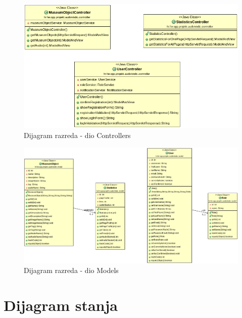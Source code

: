 			\begin{figure}[H]
				\includegraphics[scale=0.6]{slike/Controller.png}
				\centering
				\caption{ Dijagram razreda - dio Controllers}
				\label{fig:promjene}
			\end{figure}
		
			\begin{figure}[H]
				\includegraphics[scale=0.4]{slike/Models.png}
				\centering
				\caption{Dijagram razreda - dio Models}
				\label{fig:promjene}
			\end{figure}
			
		
		
		
		
		
		
		
		
		
		
		\section{Dijagram stanja}
		
